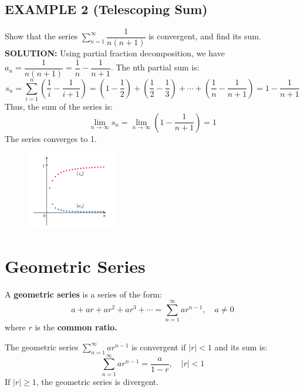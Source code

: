 \documentclass{article}
\begin{document}
\subsection*{EXAMPLE 2 (Telescoping Sum)}
Show that the series \( \sum_{n=1}^{\infty} \dfrac{1}{n(n+1)} \) is convergent, and find its sum.\\
\textbf{SOLUTION:}
Using partial fraction decomposition, we have \( a_n = \dfrac{1}{n(n+1)} = \dfrac{1}{n} - \dfrac{1}{n+1} \).
The nth partial sum is:
\[ s_n = \sum_{i=1}^{n} \left(\dfrac{1}{i} - \dfrac{1}{i+1}\right) = \left(1 - \dfrac{1}{2}\right) + \left(\dfrac{1}{2} - \dfrac{1}{3}\right) + \cdots + \left(\dfrac{1}{n} - \dfrac{1}{n+1}\right) = 1 - \dfrac{1}{n+1} \]
Thus, the sum of the series is:
\[ \lim_{n\to\infty} s_n = \lim_{n\to\infty} \left(1 - \dfrac{1}{n+1}\right) = 1 \]
The series converges to 1.
\begin{figure}[htbp]
    \centering
    \includegraphics[width=0.35\textwidth]{graph73.png}
\end{figure}

\section*{Geometric Series}
A \textbf{geometric series} is a series of the form:
\[ a + ar + ar^2 + ar^3 + \cdots = \sum_{n=1}^{\infty} ar^{n-1}, \quad a \neq 0 \]
where \(r\) is the \textbf{common ratio.}

\begin{tcolorbox}[
    colback=white,
    colframe=orange!80!white,
    title=Sum of a Geometric Series,
    boxrule=0.5mm,
    arc=3mm
    ]
    The geometric series \( \sum_{n=1}^{\infty} ar^{n-1} \) is convergent if \(|r|<1\) and its sum is:
    \[ \sum_{n=1}^{\infty} ar^{n-1} = \dfrac{a}{1 - r}, \quad |r| < 1 \]
    If \(|r| \ge 1\), the geometric series is divergent.
\end{tcolorbox}
\end{document}
